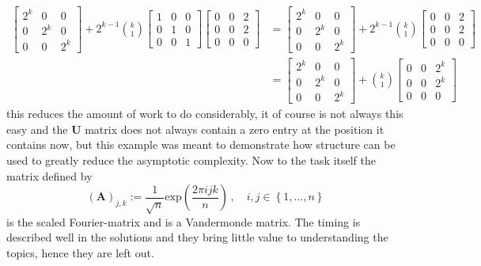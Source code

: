 \documentclass{article}
\begin{document}
\begin{align*}
    \begin{bmatrix}
    2^{k} & 0 & 0 \\
    0 & 2^{k} & 0 \\
    0 & 0 & 2^{k}
\end{bmatrix} + 2^{k-1}\binom{k}{1}\begin{bmatrix}
    1 & 0 & 0 \\
    0 & 1 & 0 \\
    0 & 0 & 1
\end{bmatrix}\begin{bmatrix}
    0 & 0 & 2 \\
    0 & 0 & 2 \\
    0 & 0 & 0
   \end{bmatrix} &= \begin{bmatrix}
    2^{k} & 0 & 0 \\
    0 & 2^{k} & 0 \\
    0 & 0 & 2^{k}
\end{bmatrix} + 2^{k-1}\binom{k}{1}\begin{bmatrix}
    0 & 0 & 2 \\
    0 & 0 & 2 \\
    0 & 0 & 0
   \end{bmatrix} \\
   &= \begin{bmatrix}
    2^{k} & 0 & 0 \\
    0 & 2^{k} & 0 \\
    0 & 0 & 2^{k}
\end{bmatrix} + \binom{k}{1}\begin{bmatrix}
    0 & 0 & 2^{k} \\
    0 & 0 & 2^{k} \\
    0 & 0 & 0
   \end{bmatrix}
\end{align*}
this reduces the amount of work to do considerably, it of course is not always this easy and the $\mathbf{U}$ matrix does not always contain a zero entry at the position it contains now, but this example was meant to demonstrate how structure can be used to greatly reduce the asymptotic complexity. Now to the task itself the matrix defined by 
\begin{equation*}
    \left(\mathbf{A}\right)_{j,k} := \frac{1}{\sqrt{n}}\text{exp}\left(\frac{2\pi i j k}{n}\right) \,,\quad i,j \in \left\{1, \dots, n\right\}
\end{equation*}
is the scaled Fourier-matrix and is a Vandermonde matrix. The timing is described well in the solutions and they bring little value to understanding the topics, hence they are left out.
\end{document}
